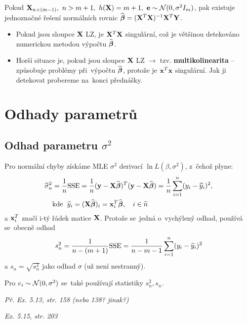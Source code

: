\begin{remark}
	Pokud $\mathbf{X}_{n\times(m-1)},~n>m+1,~h(\mathbf{X}) = m+1,~\mathbf{e}\sim\mathcal{N}(0,\sigma^2 I_m)$, pak existuje jednoznačné řešení normálních rovnic $\widehat{\boldsymbol{\beta}} = (\mathbf{X}^T\mathbf{X})^{-1}\mathbf{X}^T\mathbf{Y}$.
\end{remark}
\begin{remark}
	\begin{itemize}
		\item Pokud jsou sloupce $\mathbf{X}$ LZ, je $\mathbf{X}^T\mathbf{X}$ singulární, což je většinou detekováno numerickou metodou výpočtu $\widehat{\boldsymbol{\beta}}$.
		\item Horší situace je, pokud jsou sloupce $\mathbf{X}$  LZ $\rightarrow$ tzv. \textbf{multikolinearita} -- způsobuje problémy při~výpočtu $\widehat{\boldsymbol{\beta}}$, protože je $\mathbf{x}^T\mathbf{x}$  singulární. Jak ji detekovat probereme na~konci přednášky.
	\end{itemize}
\end{remark}

\section{Odhady parametrů}
\subsection{Odhad parametru $\sigma^2$ }
Pro normální chyby získáme MLE $\sigma^2$ derivací $\ln L(\beta, \sigma^2)$, z~čehož plyne:
\begin{align*}
	\widehat{\sigma}_n^2 & = \frac{1}{n} \mathrm{SSE} = \frac{1}{n}(\mathbf{y} - \mathbf{X} \widehat{\boldsymbol{\beta}})^T(\mathbf{y} - \mathbf{X} \widehat{\boldsymbol{\beta}}) = \frac{1}{n} \sum\limits_{i=1}^{n} (y_i - \widehat{y}_i)^2, \\
	& \text{kde \;} \widehat{y}_i = (\mathbf{X} \widehat{\boldsymbol{\beta}})_i = \mathbf{x}_i^T \widehat{\boldsymbol{\beta}}, \quad i\in\widehat{n} \\
\end{align*}
a $\mathbf{x}_i^T$ značí i-tý řádek matice $\mathbf{X}$. Protože se~jedná o~vychýlený odhad, používá se~obecně odhad
 $$
	s_n^2 = \frac{1}{n-(m+1)} \mathrm{SSE} = \frac{1}{n - m - 1} \sum\limits_{i=1}^{n} (y_i - \widehat{y}_i)^2
 $$
a $s_n = \sqrt{s_n^2}$ jako odhad $\sigma$ (už není nestranný).

Pro $e_i \sim \mathcal{N}(0,\sigma^2)$ se~také používají statistiky $s_n^2, s_n$.

\textit{Př. Ex. 5.13, str. 158 (nebo 138? jinak?)}

\textit{Ex. 5.15, str. 203}

